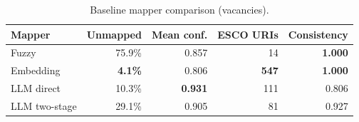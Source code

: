 \begin{table}[htbp]
  \centering
  \caption{Baseline mapper comparison (vacancies).}
  \label{tab:baseline-vac}
  \begin{tabular}{lrrrr}
    \toprule
    Mapper & Unmapped & Mean conf. & ESCO URIs & Consistency \\
    \midrule
  Fuzzy & 75.9\% & 0.857 & 14 & \textbf{1.000} \\
  Embedding & \textbf{4.1\%} & 0.806 & \textbf{547} & \textbf{1.000} \\
  LLM direct & 10.3\% & \textbf{0.931} & 111 & 0.806 \\
  LLM two-stage & 29.1\% & 0.905 & 81 & 0.927 \\
    \bottomrule
  \end{tabular}
\end{table}